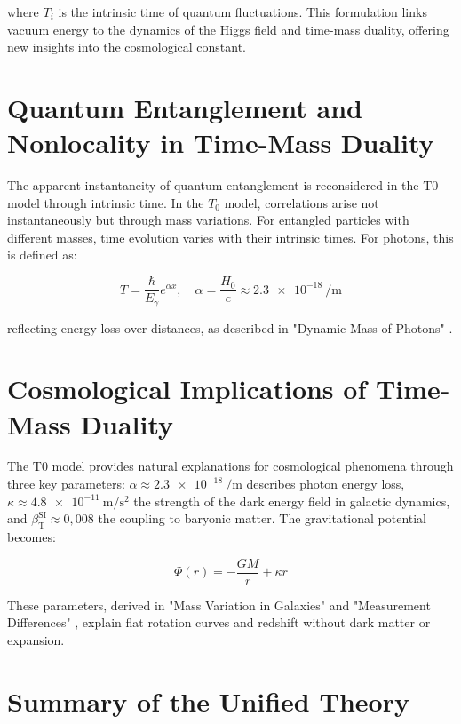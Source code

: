 \documentclass[a4paper,12pt]{article}
\newcommand{\betaT}{\beta_{\text{T}}}
\begin{document}
	where \(T_i\) is the intrinsic time of quantum fluctuations. This formulation links vacuum energy to the dynamics of the Higgs field and time-mass duality, offering new insights into the cosmological constant.
	
	\section{Quantum Entanglement and Nonlocality in Time-Mass Duality}
	
	The apparent instantaneity of quantum entanglement is reconsidered in the T0 model through intrinsic time. In the \(T_0\) model, correlations arise not instantaneously but through mass variations. For entangled particles with different masses, time evolution varies with their intrinsic times. For photons, this is defined as:
	
	\begin{equation}
		T = \frac{\hbar}{E_{\gamma}} e^{\alpha x}, \quad \alpha = \frac{H_0}{c} \approx \SI{2.3e-18}{\per\meter}
	\end{equation}
	
	reflecting energy loss over distances, as described in "Dynamic Mass of Photons" \cite{pascher_photons_2025}.
	
	\section{Cosmological Implications of Time-Mass Duality}
	
	The T0 model provides natural explanations for cosmological phenomena through three key parameters: \(\alpha \approx \SI{2.3e-18}{\per\meter}\) describes photon energy loss, \(\kappa \approx \SI{4.8e-11}{\meter\per\second\squared}\) the strength of the dark energy field in galactic dynamics, and \(\betaT^{\text{SI}} \approx 0{,}008\) the coupling to baryonic matter. The gravitational potential becomes:
	
	\begin{equation}
		\Phi(r) = -\frac{G M}{r} + \kappa r
	\end{equation}
	
	These parameters, derived in "Mass Variation in Galaxies" \cite{pascher_galaxies_2025} and "Measurement Differences" \cite{pascher_messdifferenzen_2025}, explain flat rotation curves and redshift without dark matter or expansion.
	
	\section{Summary of the Unified Theory}
	
\end{document}
